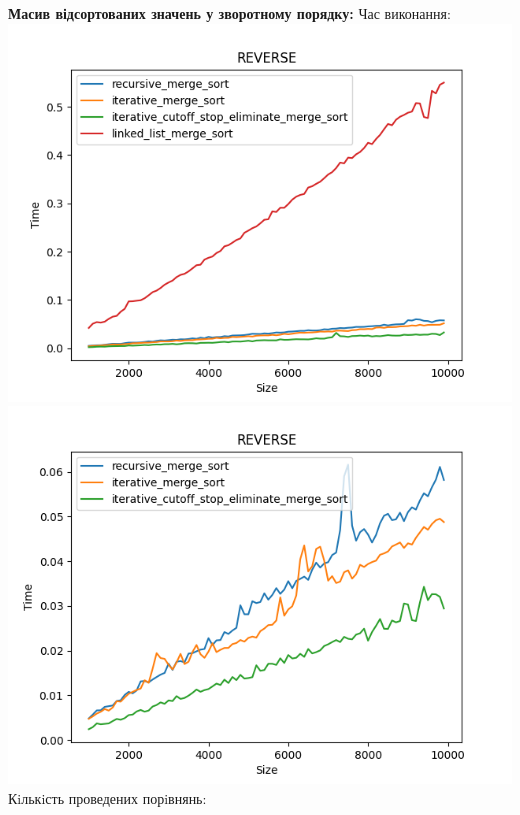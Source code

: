 \documentclass{article}
\begin{document}
        \newpage
        \textbf{Масив відсортованих значень у зворотному порядку:}
        \newline
        Час виконання:
        \newline
            \includegraphics[scale=0.5]{reverse_Time_4_sorts_90_numbers_50.png}
            \includegraphics[scale=0.5]{reverse_Time_3_sorts_90_numbers_50.png}
        \newline
        Кiлькiсть проведених порiвнянь:
        \newline
\end{document}
